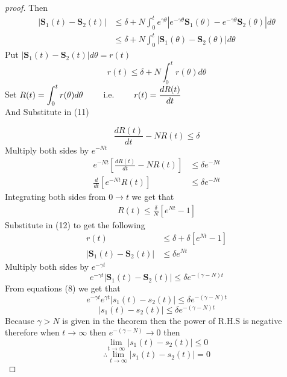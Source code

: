 \documentclass[]{article}
\begin{document}
\begin{proof}[proof]
    \par
    Then
    \begin{align*}
        |\mathbf{S}_1(t) - \mathbf{S}_2(t)| & \leq \delta  + N \int_{0}^{t} e^{\gamma \theta} \left\lvert e^{-\gamma \theta}\mathbf{S}_1(\theta) -e^{-\gamma \theta} \mathbf{S}_2(\theta) \right\rvert d\theta
        \\
                                            & \leq \delta  + N \int_{0}^{t} \left\lvert \mathbf{S}_1(\theta) - \mathbf{S}_2(\theta) \right\rvert d\theta
    \end{align*}
    Put $\left\lvert \mathbf{S}_1(t) - \mathbf{S}_2(t) \right\rvert d\theta = r(t)$
    \begin{equation}
        r(t) \leq \delta  + N \int_{0}^{t} r(\theta) d\theta
    \end{equation}
    Set $\displaystyle R(t) = \int_{0}^{t} r(\theta)d\theta \quad\quad$ i.e. $\quad\quad \displaystyle r(t) = \frac{dR(t)}{dt} $
    \\
    And Substitute in (11)



    \begin{equation}
        \frac{dR(t)}{dt} - NR(t) \leq \delta
    \end{equation}
    Multiply both sides by $e^{-Nt}$
    \begin{align*}
        e^{-Nt}\left[\frac{dR(t)}{dt} - NR(t)\right] & \leq \delta e^{-Nt}
        \\
        \frac{d}{dt}\left[e^{-Nt}R(t)\right]         & \leq \delta e^{-Nt}
    \end{align*}
    Integrating both sides from $0 \to t$ we get that
    \begin{align*}
        R(t) \leq \frac{\delta}{N}\left[e^{Nt}-1\right]
    \end{align*}
    Substitute in (12) to get the following
    \begin{align*}
        r(t)                                & \leq \delta + \delta\left[e^{Nt}-1\right]
        \\
        |\mathbf{S}_1(t) - \mathbf{S}_2(t)| & \leq \delta e^{Nt}
    \end{align*}
    Multiply both sides by $e^{-\gamma t}$
    \[
        e^{-\gamma t}|\mathbf{S}_1(t) - \mathbf{S}_2(t)|  \leq \delta e^{-(\gamma-N)t}
    \]
    From equations (8) we get that
    \[
        e^{-\gamma t}e^{\gamma t}|s_1(t) - s_2(t)|  \leq \delta e^{-(\gamma-N)t}
    \]
    \[
        |s_1(t) - s_2(t)|  \leq \delta e^{-(\gamma-N)t}
    \]
    Because $\gamma > N$ is given in the theorem then the power of R.H.S is negative therefore
    when $t \to \infty$ then $e^{-(\gamma-N)} \to 0$ then
    \[
        \lim_{t \to \infty} |s_1(t) - s_2(t)| \leq 0
    \]
    \[
        \therefore \lim_{t \to \infty} |s_1(t) - s_2(t)| = 0
    \]
\end{proof}
\end{document}
